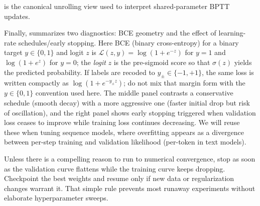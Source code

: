  is the canonical unrolling view used to interpret shared-parameter BPTT updates.

Finally,  summarizes two diagnostics: BCE geometry and the effect of learning\hyp{}rate schedules/early stopping.
Here BCE (binary cross\hyp{}entropy) for a binary target $y\in\{0,1\}$ and logit $z$ is $\mathcal{L}(z, y)=\log(1+e^{-z})$ for $y{=}1$ and $\log(1+e^{z})$ for $y{=}0$; the \emph{logit} $z$ is the pre\hyp{}sigmoid score so that $\sigma(z)$ yields the predicted probability. If labels are recoded to \(y_{\pm}\in\{-1,+1\}\), the same loss is written compactly as \(\log(1+e^{-y_{\pm}z})\); do not mix that margin form with the \(y\in\{0,1\}\) convention used here. The middle panel contrasts a conservative schedule (smooth decay) with a more aggressive one (faster initial drop but risk of oscillation), and the right panel shows early stopping triggered when validation loss ceases to improve while training loss continues decreasing.
We will reuse these when tuning sequence models, where overfitting appears as a divergence between per\hyp{}step training and validation likelihood (per\hyp{}token in text models).

\begin{tcolorbox}[summarybox, title={Author's note: treat early stopping as the default brake}]
Unless there is a compelling reason to run to numerical convergence, stop as soon as the validation curve flattens while the training curve keeps dropping. Checkpoint the best weights and resume only if new data or regularization changes warrant it. That simple rule prevents most runaway experiments without elaborate hyperparameter sweeps.
\end{tcolorbox}

